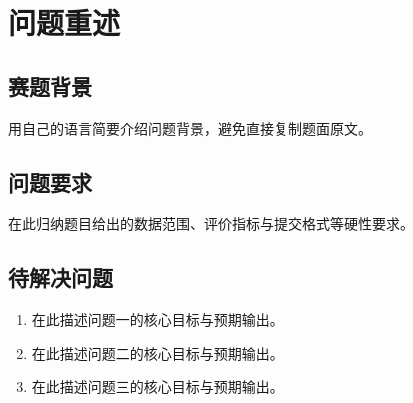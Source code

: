 \section{问题重述}


\subsection{赛题背景}
用自己的语言简要介绍问题背景，避免直接复制题面原文。

\subsection{问题要求}
在此归纳题目给出的数据范围、评价指标与提交格式等硬性要求。

\subsection{待解决问题}
\begin{enumerate}[label=问题 \arabic*：,leftmargin=*]
  \item 在此描述问题一的核心目标与预期输出。
  \item 在此描述问题二的核心目标与预期输出。
  \item 在此描述问题三的核心目标与预期输出。
\end{enumerate}
